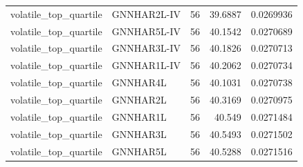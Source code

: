 \begin{tabular}{llrrr}
volatile_top_quartile & GNNHAR2L-IV & 56 & 39.6887 & 0.0269936 \\
volatile_top_quartile & GNNHAR5L-IV & 56 & 40.1542 & 0.0270689 \\
volatile_top_quartile & GNNHAR3L-IV & 56 & 40.1826 & 0.0270713 \\
volatile_top_quartile & GNNHAR1L-IV & 56 & 40.2062 & 0.0270734 \\
volatile_top_quartile & GNNHAR4L & 56 & 40.1031 & 0.0270738 \\
volatile_top_quartile & GNNHAR2L & 56 & 40.3169 & 0.0270975 \\
volatile_top_quartile & GNNHAR1L & 56 & 40.549 & 0.0271484 \\
volatile_top_quartile & GNNHAR3L & 56 & 40.5493 & 0.0271502 \\
volatile_top_quartile & GNNHAR5L & 56 & 40.5288 & 0.0271516 \\
\bottomrule
\end{tabular}
